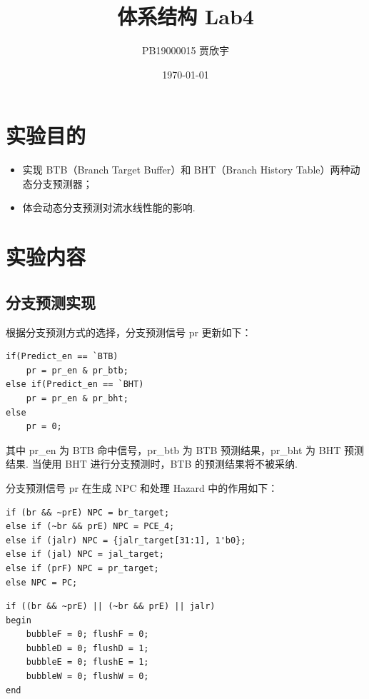 \documentclass[UTF8]{ctexart}
\title{体系结构 Lab4}
\author{PB19000015 贾欣宇}
\date{\today}
\begin{document}
\maketitle
\tableofcontents

\section{实验目的}

\begin{itemize} 
    \item 实现 BTB（Branch Target Buffer）和 BHT（Branch History Table）两种动态分支预测器；
    \item 体会动态分支预测对流水线性能的影响.
\end{itemize}

\section{实验内容}

\subsection{分支预测实现}

根据分支预测方式的选择，分支预测信号 pr 更新如下：

\begin{lstlisting}[style=verilog,caption={更新分支预测信号 pr}]
if(Predict_en == `BTB)
    pr = pr_en & pr_btb;
else if(Predict_en == `BHT)
    pr = pr_en & pr_bht;
else
    pr = 0;  
\end{lstlisting}

其中 pr\_en 为 BTB 命中信号，pr\_btb 为 BTB 预测结果，pr\_bht 为 BHT 预测结果. 当使用 BHT 进行分支预测时，BTB 的预测结果将不被采纳.

分支预测信号 pr 在生成 NPC 和处理 Hazard 中的作用如下：

\begin{lstlisting}[style=verilog,caption={生成 NPC}]
if (br && ~prE) NPC = br_target;
else if (~br && prE) NPC = PCE_4;
else if (jalr) NPC = {jalr_target[31:1], 1'b0};
else if (jal) NPC = jal_target;
else if (prF) NPC = pr_target;
else NPC = PC;
\end{lstlisting}

\begin{lstlisting}[style=verilog,caption={处理 Hazard}]
if ((br && ~prE) || (~br && prE) || jalr)
begin
    bubbleF = 0; flushF = 0;
    bubbleD = 0; flushD = 1;
    bubbleE = 0; flushE = 1;
    bubbleW = 0; flushW = 0;
end
\end{lstlisting}
\end{document}
